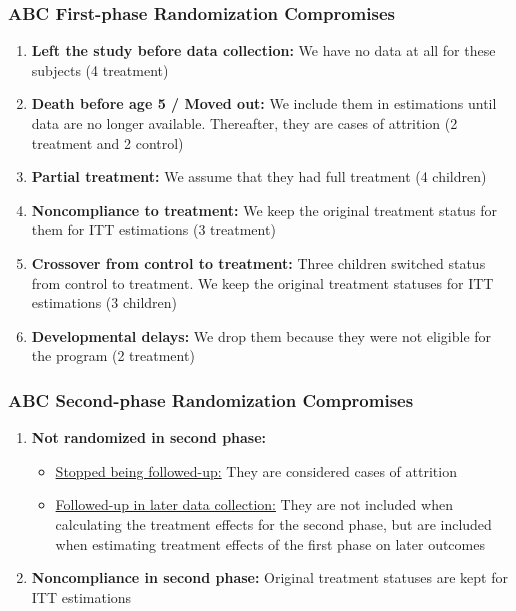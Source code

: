 \documentclass[static]{JJH-Beamer}
\begin{document}
\begin{frame}
\frametitle{ABC First-phase Randomization Compromises}

\begin{enumerate}
\item \textbf{Left the study before data collection:} We have no data at all for these subjects (4 treatment)
\item \textbf{Death before age 5 / Moved out:} We include them in estimations until data are no longer available. Thereafter, they are cases of attrition (2 treatment and 2 control)
\item \textbf{Partial treatment:} We assume that they had full treatment (4 children)
\item \textbf{Noncompliance to treatment:} We keep the original treatment status for them for ITT estimations (3 treatment)
\item \textbf{Crossover from control to treatment:} Three children switched status from control to treatment. We keep the original treatment statuses for ITT estimations (3 children)
\item \textbf{Developmental delays:} We drop them because they were not eligible for the program (2 treatment)
\end{enumerate}

\end{frame}

\begin{frame}
\frametitle{ABC Second-phase Randomization Compromises}

\begin{enumerate}
\item \textbf{Not randomized in second phase:}
	\begin{itemize}
	\item \underline{Stopped being followed-up:} They are considered cases of attrition
    \item \underline{Followed-up in later data collection:} They are not included when calculating the treatment effects for the second phase, but are included when estimating treatment effects of the first phase on later outcomes
	\end{itemize}
\item \textbf{Noncompliance in second phase:} Original treatment statuses are kept for ITT estimations
\end{enumerate}

\end{frame}
\end{document}
